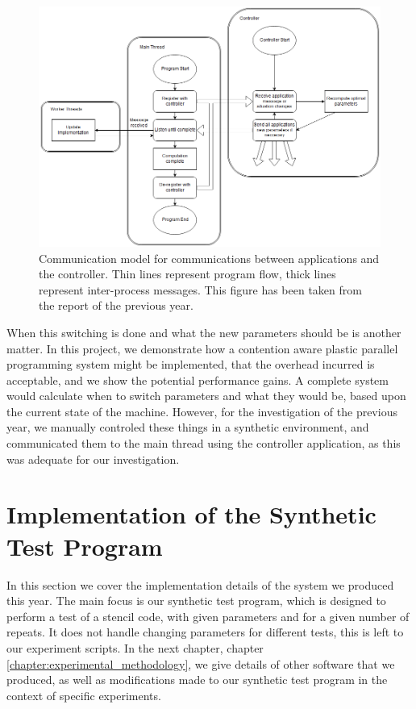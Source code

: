 \begin{figure}[H]
	\centering
	\includegraphics[width=1.1\textwidth]{graphics/controller_communication_flowchart.png}
	\caption{Communication model for communications between applications and the controller. Thin lines represent program flow, thick lines represent inter-process messages. This figure has been taken from the report of the previous year.}
	\label{fig:controller_flowchart}
\end{figure}



When this switching is done and what the new parameters should be is another matter. In this project, we demonstrate how a contention aware plastic parallel programming system might be implemented, that the overhead incurred is acceptable, and we show the potential performance gains. A complete system would calculate when to switch parameters and what they would be, based upon the current state of the machine. However, for the investigation of the previous year, we manually controled these things in a synthetic environment, and communicated them to the main thread using the controller application, as this was adequate for our investigation.



\section{Implementation of the Synthetic Test Program}
\label{section:implementation:implementation_of_the_synthetic_test_program}

In this section we cover the implementation details of the system we produced this year. The main focus is our synthetic test program, which is designed to perform a test of a stencil code, with given parameters and for a given number of repeats. It does not handle changing parameters for different tests, this is left to our experiment scripts. In the next chapter, chapter \ref{chapter:experimental_methodology}, we give details of other software that we produced, as well as modifications made to our synthetic test program in the context of specific experiments.



